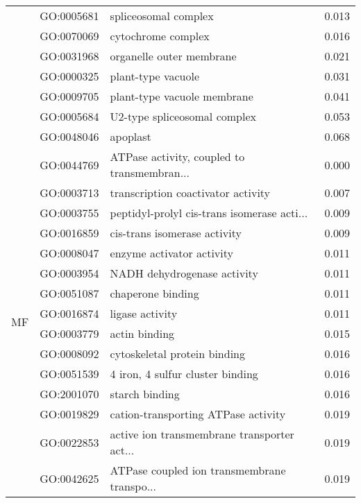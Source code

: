 \begin{longtable}{lllr}
   & GO:0005681 &                         spliceosomal complex &         0.013 \\
   & GO:0070069 &                           cytochrome complex &         0.016 \\
   & GO:0031968 &                     organelle outer membrane &         0.021 \\
   & GO:0000325 &                           plant-type vacuole &         0.031 \\
   & GO:0009705 &                  plant-type vacuole membrane &         0.041 \\
   & GO:0005684 &                 U2-type spliceosomal complex &         0.053 \\
   & GO:0048046 &                                     apoplast &         0.068 \\
\cline{1-4}
\multirow{38}{*}{MF} & GO:0044769 &  ATPase activity, coupled to transmembran... &         0.000 \\
   & GO:0003713 &           transcription coactivator activity &         0.007 \\
   & GO:0003755 &  peptidyl-prolyl cis-trans isomerase acti... &         0.009 \\
   & GO:0016859 &                 cis-trans isomerase activity &         0.009 \\
   & GO:0008047 &                    enzyme activator activity &         0.011 \\
   & GO:0003954 &                  NADH dehydrogenase activity &         0.011 \\
   & GO:0051087 &                            chaperone binding &         0.011 \\
   & GO:0016874 &                              ligase activity &         0.011 \\
   & GO:0003779 &                                actin binding &         0.015 \\
   & GO:0008092 &                 cytoskeletal protein binding &         0.016 \\
   & GO:0051539 &             4 iron, 4 sulfur cluster binding &         0.016 \\
   & GO:2001070 &                               starch binding &         0.016 \\
   & GO:0019829 &          cation-transporting ATPase activity &         0.019 \\
   & GO:0022853 &  active ion transmembrane transporter act... &         0.019 \\
   & GO:0042625 &  ATPase coupled ion transmembrane transpo... &         0.019 \\

\end{longtable}
